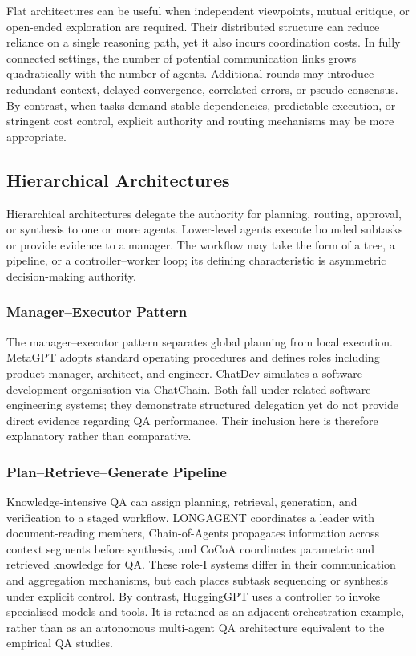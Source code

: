 Flat architectures can be useful when independent viewpoints, mutual critique, or open-ended exploration are required. Their distributed structure can reduce reliance on a single reasoning path, yet it also incurs coordination costs.
In fully connected settings, the number of potential communication links grows quadratically with the number of agents. Additional rounds may introduce redundant context, delayed convergence, correlated errors, or pseudo-consensus.
By contrast, when tasks demand stable dependencies, predictable execution, or stringent cost control, explicit authority and routing mechanisms may be more appropriate.

\subsection{Hierarchical Architectures}
\label{sec:hierarchical}

Hierarchical architectures delegate the authority for planning, routing, approval, or synthesis to one or more agents. Lower-level agents execute bounded subtasks or provide evidence to a manager. The workflow may take the form of a tree, a pipeline, or a controller–worker loop; its defining characteristic is asymmetric decision-making authority.

\subsubsection{Manager--Executor Pattern}
\label{sec:manager_executor}

The manager–executor pattern separates global planning from local execution.
MetaGPT \citep{hong2024metagpt} adopts standard operating procedures and defines roles
including product manager, architect, and engineer. ChatDev \citep{qian2023chatdev}
simulates a software development organisation via ChatChain. Both fall under related software engineering systems; they demonstrate structured delegation
yet do not provide direct evidence regarding QA performance. Their inclusion here
is therefore explanatory rather than comparative.

\subsubsection{Plan--Retrieve--Generate Pipeline}
\label{sec:pipeline}

Knowledge-intensive QA can assign planning, retrieval, generation, and
verification to a staged workflow. LONGAGENT \citep{zhao2024longagent}
coordinates a leader with document-reading members, Chain-of-Agents
\citep{zhang2024chain_agents} propagates information across context segments
before synthesis, and CoCoA \citep{jiang2026cocoa} coordinates parametric and
retrieved knowledge for QA. These role-I systems differ in their communication
and aggregation mechanisms, but each places subtask sequencing or synthesis
under explicit control. By contrast, HuggingGPT \citep{shen2024hugginggpt}
uses a controller to invoke specialised models and tools. It is retained as an
adjacent orchestration example, rather than as an autonomous multi-agent QA
architecture equivalent to the empirical QA studies.




